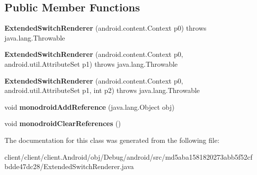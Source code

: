 \subsection*{Public Member Functions}
\begin{DoxyCompactItemize}
\item 
\hypertarget{classmd5aba1581820273abb5f52cfbdde47dc28_1_1ExtendedSwitchRenderer_adb474d97f9ec5f0220ff616137903fdf}{}{\bfseries Extended\+Switch\+Renderer} (android.\+content.\+Context p0)  throws java.\+lang.\+Throwable 	\label{classmd5aba1581820273abb5f52cfbdde47dc28_1_1ExtendedSwitchRenderer_adb474d97f9ec5f0220ff616137903fdf}

\item 
\hypertarget{classmd5aba1581820273abb5f52cfbdde47dc28_1_1ExtendedSwitchRenderer_a0f29a34066578fc1d36360dabfdc7611}{}{\bfseries Extended\+Switch\+Renderer} (android.\+content.\+Context p0, android.\+util.\+Attribute\+Set p1)  throws java.\+lang.\+Throwable 	\label{classmd5aba1581820273abb5f52cfbdde47dc28_1_1ExtendedSwitchRenderer_a0f29a34066578fc1d36360dabfdc7611}

\item 
\hypertarget{classmd5aba1581820273abb5f52cfbdde47dc28_1_1ExtendedSwitchRenderer_ace66204e1f58266b6c9c6e983f2b37b4}{}{\bfseries Extended\+Switch\+Renderer} (android.\+content.\+Context p0, android.\+util.\+Attribute\+Set p1, int p2)  throws java.\+lang.\+Throwable 	\label{classmd5aba1581820273abb5f52cfbdde47dc28_1_1ExtendedSwitchRenderer_ace66204e1f58266b6c9c6e983f2b37b4}

\item 
\hypertarget{classmd5aba1581820273abb5f52cfbdde47dc28_1_1ExtendedSwitchRenderer_acbd052b0dbce5f75078780bc2aa88ed8}{}void {\bfseries monodroid\+Add\+Reference} (java.\+lang.\+Object obj)\label{classmd5aba1581820273abb5f52cfbdde47dc28_1_1ExtendedSwitchRenderer_acbd052b0dbce5f75078780bc2aa88ed8}

\item 
\hypertarget{classmd5aba1581820273abb5f52cfbdde47dc28_1_1ExtendedSwitchRenderer_a7d89cd0943a8114500011a90b09120f1}{}void {\bfseries monodroid\+Clear\+References} ()\label{classmd5aba1581820273abb5f52cfbdde47dc28_1_1ExtendedSwitchRenderer_a7d89cd0943a8114500011a90b09120f1}

\end{DoxyCompactItemize}


The documentation for this class was generated from the following file\+:\begin{DoxyCompactItemize}
\item 
client/client/client.\+Android/obj/\+Debug/android/src/md5aba1581820273abb5f52cfbdde47dc28/Extended\+Switch\+Renderer.\+java\end{DoxyCompactItemize}
